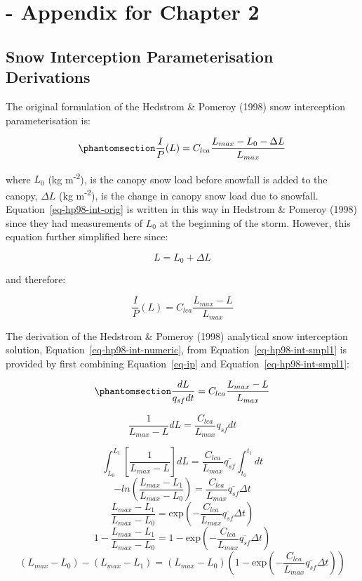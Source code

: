 \documentclass[
  letterpaper,
]{tex/uofsthesis-cs}
\begin{document}
\cleardoublepage
{}
{}
\appendix

\chapter{- Appendix for Chapter 2}\label{sec-review-appendix}

\section{Snow Interception Parameterisation
Derivations}\label{snow-interception-parameterisation-derivations}

The original formulation of the Hedstrom \& Pomeroy (1998) snow
interception parameterisation is:

\begin{equation}\phantomsection\label{eq-hp98-int-orig}{
\frac{I}{P}(L) = C_{lca} \frac{L_{max}-L_0-\Delta L}{L_{max}}
}\end{equation}

where \(L_0\) (kg m\textsuperscript{-2}), is the canopy snow load before
snowfall is added to the canopy, \(\Delta L\) (kg
m\textsuperscript{-2}), is the change in canopy snow load due to
snowfall. Equation~\ref{eq-hp98-int-orig} is written in this way in
Hedstrom \& Pomeroy (1998) since they had measurements of \(L_0\) at the
beginning of the storm. However, this equation further simplified here
since:

\[
L = L_0 + \Delta L
\]

and therefore:

\[
\frac{I}{P}(L) = C_{lca}\frac{L_{max}-L}{L_{max}}
\]

The derivation of the Hedstrom \& Pomeroy (1998) analytical snow
interception solution, Equation~\ref{eq-hp98-int-numeric}, from
Equation~\ref{eq-hp98-int-smpl1} is provided by first combining
Equation~\ref{eq-ip} and Equation~\ref{eq-hp98-int-smpl1}:

\begin{equation}\phantomsection\label{eq-hp98-int-smpl}{
\frac{dL}{q_{sf} dt} = C_{lca}\frac{L_{max}-L}{L_{max}}
}\end{equation}

\[\frac{1}{L_{max}-L} dL = \frac{C_{lca}}{L_{max}} q_{sf} dt\]

\[
\int^{L_1}_{L_0}\left[\frac{1}{L_{max}-L}\right] dL =\frac{C_{lca}}{L_{max}} \overline{q_{sf}} \int^{t_1}_{t_0} dt \]
\[-ln\left(\frac{L_{max}-L_1}{L_{max}-L_0}\right)  = \frac{C_{lca}}{L_{max}} \overline{q_{sf}} \Delta t \]
\[\frac{L_{max}-L_1}{L_{max}-L_0} = \text{exp} \left(-\frac{C_{lca}}{L_{max}} \overline{q_{sf}} \Delta t \right)\]
\[1-\frac{L_{max}-L_1}{L_{max}-L_0} = 1- \text{exp} \left(-\frac{C_{lca}}{L_{max}} \overline{q_{sf}} \Delta t \right)\]
\[(L_{max}-L_0)-(L_{max}-L_1) = (L_{max}-L_0)\left(1- \text{exp} \left(-\frac{C_{lca}}{L_{max}} \overline{q_{sf}} \Delta t \right) \right)\]
\end{document}
